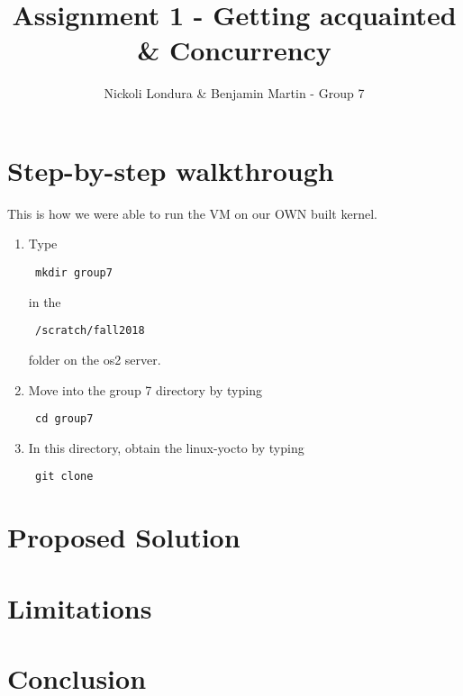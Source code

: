 \documentclass[10pt]{article}
\title{Assignment 1 - Getting acquainted \& Concurrency}
\author{Nickoli Londura \& Benjamin Martin - Group 7}
\begin{document}
\maketitle
\tableofcontents



\section{Step-by-step walkthrough}
\par This is how we were able to run the VM on our OWN built kernel.

\begin{enumerate}
\item Type \begin{verbatim} mkdir group7 \end{verbatim}  in the \begin{verbatim} /scratch/fall2018 \end{verbatim} folder on the os2 server.
\item Move into the group 7 directory by typing \begin{verbatim} cd group7 \end{verbatim}
\item In this directory, obtain the linux-yocto by typing \begin{verbatim} git clone \end{verbatim}

\end{enumerate}



\section{Proposed Solution}

\section{Limitations}

\section{Conclusion}
\end{document}
